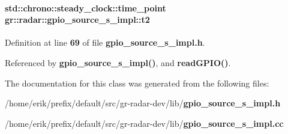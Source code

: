 \paragraph[{t2}]{\setlength{\rightskip}{0pt plus 5cm}std\+::chrono\+::steady\+\_\+clock\+::time\+\_\+point gr\+::radar\+::gpio\+\_\+source\+\_\+s\+\_\+impl\+::t2\hspace{0.3cm}{\ttfamily [private]}}\label{classgr_1_1radar_1_1gpio__source__s__impl_a3963ca484b8b1f58879656960e597c76}


Definition at line {\bf 69} of file {\bf gpio\+\_\+source\+\_\+s\+\_\+impl.\+h}.



Referenced by {\bf gpio\+\_\+source\+\_\+s\+\_\+impl()}, and {\bf read\+G\+P\+I\+O()}.



The documentation for this class was generated from the following files\+:\begin{DoxyCompactItemize}
\item 
/home/erik/prefix/default/src/gr-\/radar-\/dev/lib/{\bf gpio\+\_\+source\+\_\+s\+\_\+impl.\+h}\item 
/home/erik/prefix/default/src/gr-\/radar-\/dev/lib/{\bf gpio\+\_\+source\+\_\+s\+\_\+impl.\+cc}\end{DoxyCompactItemize}

